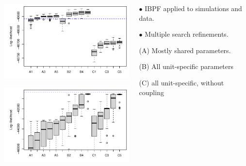 \documentclass{beamer}
\begin{document}
\begin{frame}

\begin{columns}[T] %
\begin{column}{.75\textwidth}
  \includegraphics[width=7.5cm]{ibpf/sim_search_boxplot-1.pdf}

    \includegraphics[width=7.5cm]{ibpf/data_search_boxplot-1.pdf}

  \end{column}

\hspace{-15mm}
\begin{column}{.35\textwidth}
  \vspace{5mm}
  
$\bullet$    IBPF applied to simulations and data.

    \vspace{5mm}

$\bullet$    Multiple search refinements.

    \vspace{5mm}
    
    (A) Mostly shared parameters.

    \vspace{5mm}

    (B) All unit-specific parameters

    \vspace{5mm}

    (C) all unit-specific, without coupling
    
  \end{column}
\end{columns}

\end{frame}
\end{document}
